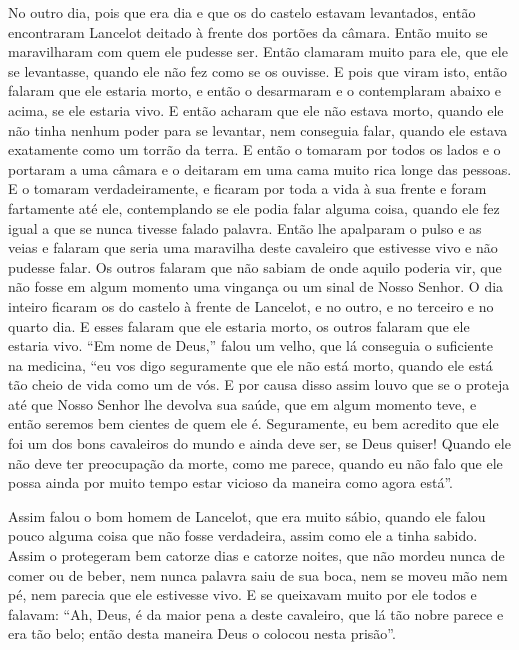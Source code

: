 No outro dia, pois que era dia e que os do castelo estavam levantados, então
encontraram Lancelot deitado à frente dos portões da câmara. Então muito se
maravilharam com quem ele pudesse ser. Então clamaram muito para ele, que ele
se levantasse, quando ele não fez como se os ouvisse. E pois que viram isto,
então falaram que ele estaria morto, e então o desarmaram e o contemplaram
abaixo e acima, se ele estaria vivo. E então acharam que ele não estava morto,
quando ele não tinha nenhum poder para se levantar, nem conseguia falar, quando
ele estava exatamente como um torrão da terra. E então o tomaram por todos os
lados e o portaram a uma câmara e o deitaram em uma cama muito rica longe das
pessoas. E o tomaram verdadeiramente, e ficaram por toda a vida à sua frente e
foram fartamente até ele, contemplando se ele podia falar alguma coisa, quando
ele fez igual a que se nunca tivesse falado palavra. Então lhe apalparam o
pulso e as veias e falaram que seria uma maravilha deste cavaleiro que
estivesse vivo e não pudesse falar. Os outros falaram que não sabiam de onde
aquilo poderia vir, que não fosse em algum momento uma vingança ou um sinal de
Nosso Senhor. O dia inteiro ficaram os do castelo à frente de
Lancelot, e no outro, e no terceiro e no quarto dia. E esses falaram que ele
estaria morto, os outros falaram que ele estaria vivo. “Em nome de Deus,” falou
um velho, que lá conseguia o suficiente na medicina, “eu vos digo seguramente
que ele não está morto, quando ele está tão cheio de vida como um de vós. E por
causa disso assim louvo que se o proteja até que Nosso Senhor lhe devolva sua
saúde, que em algum momento teve, e então seremos bem cientes de quem ele é.
Seguramente, eu bem acredito que ele foi um dos bons cavaleiros do mundo e
ainda deve ser, se Deus quiser! Quando ele não deve ter preocupação da morte,
como me parece, quando eu não falo que ele possa ainda por muito tempo estar
vicioso da maneira como agora está”. 

Assim falou o bom homem de Lancelot, que era muito sábio, quando ele falou
pouco alguma coisa que não fosse verdadeira, assim como ele a tinha sabido.
Assim o protegeram bem catorze dias e catorze noites, que não mordeu nunca de
comer ou de beber, nem nunca palavra saiu de sua boca, nem se moveu mão nem pé,
nem parecia que ele estivesse vivo. E se queixavam muito por ele todos e
falavam: “Ah, Deus, é da maior pena a deste cavaleiro, que lá tão nobre parece
e era tão belo; então desta maneira Deus o colocou nesta prisão”.

